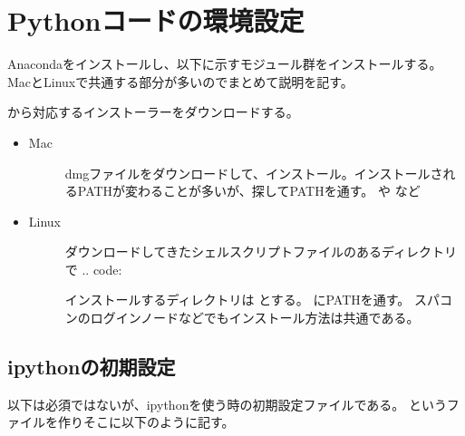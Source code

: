 \documentclass[letterpaper,10pt,dvipdfmx,report]{sphinxmanual}
\begin{document}
\section{Pythonコードの環境設定}
\label{\detokenize{environment:python}}
Anacondaをインストールし、以下に示すモジュール群をインストールする。
MacとLinuxで共通する部分が多いのでまとめて説明を記す。

 から対応するインストーラーをダウンロードする。
\begin{itemize}
\item {} \begin{description}
\item[{Mac}] \leavevmode
dmgファイルをダウンロードして、インストール。インストールされるPATHが変わることが多いが、探してPATHを通す。  や  など

\end{description}

\item {} \begin{description}
\item[{Linux}] \leavevmode
ダウンロードしてきたシェルスクリプトファイルのあるディレクトリで
.. code:

\begin{sphinxVerbatim}[commandchars=\\\{\}]
 
\end{sphinxVerbatim}

インストールするディレクトリは  とする。
 にPATHを通す。
スパコンのログインノードなどでもインストール方法は共通である。

\end{description}

\end{itemize}


\subsection{ipythonの初期設定}
\label{\detokenize{environment:ipython}}
以下は必須ではないが、ipythonを使う時の初期設定ファイルである。
というファイルを作りそこに以下のように記す。
\end{document}
